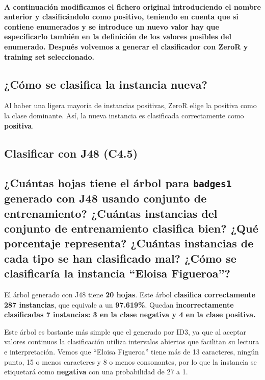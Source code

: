 \documentclass[12pt]{article}
\begin{document}
\paragraph{\small A continuación modificamos el fichero original introduciendo el nombre anterior y clasificándolo como positivo, teniendo en cuenta que si contiene enumerados y se introduce un nuevo valor hay que especificarlo también en la definición de los valores posibles del enumerado. Después volvemos a generar el clasificador con ZeroR y training set seleccionado.}

\subsection*{\small ¿Cómo se clasifica la instancia nueva?}

Al haber una ligera mayoría de instancias positivas, ZeroR elige la positiva como la clase dominante. Así, la nueva instancia es clasificada correctamente como \textbf{positiva}.

\newpage

\begin{center}
\section{Clasificar con J48 (C4.5)}
\end{center}

\subsection*{\small ¿Cuántas hojas tiene el árbol para \texttt{badges1} generado con J48 usando conjunto de entrenamiento? ¿Cuántas instancias del conjunto de entrenamiento clasifica bien? ¿Qué porcentaje representa? ¿Cuántas instancias de cada tipo se han clasificado mal? ¿Cómo se clasificaría la instancia ``Eloisa Figueroa''?}

El árbol generado con J48 tiene \textbf{20 hojas}. Este árbol \textbf{clasifica correctamente 287 instancias}, que equivale a un \textbf{97.619\%}. Quedan \textbf{incorrectamente clasificadas 7 instancias: 3 en la clase negativa y 4 en la clase positiva.}

Este árbol es bastante más simple que el generado por ID3, ya que al aceptar valores continuos la clasificación utiliza intervalos abiertos que facilitan su lectura e interpretación. Vemos que ``Eloisa Figueroa'' tiene más de 13 caracteres, ningún punto, 15 o menos caracteres y 8 o menos consonantes, por lo que la instancia se etiquetará como \textbf{negativa} con una probabilidad de 27 a 1.
\end{document}

